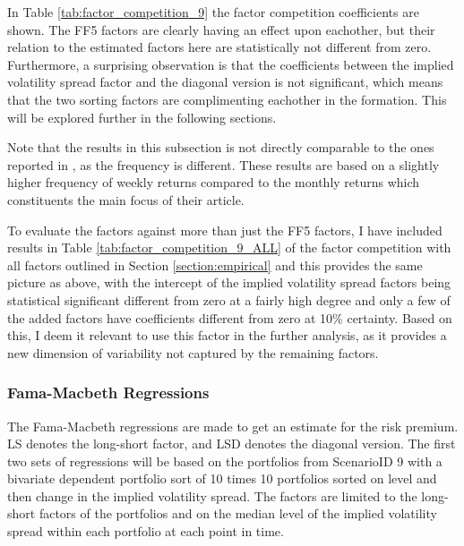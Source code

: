 In Table \ref{tab:factor_competition_9} the factor competition coefficients are shown. The FF5 factors are clearly having an effect upon eachother, but their relation to the estimated factors here are statistically not different from zero. Furthermore, a surprising observation is that the coefficients between the implied volatility spread factor and the diagonal version is not significant, which means that the two sorting factors are complimenting eachother in the formation. This will be explored further in the following sections. 

Note that the results in this subsection is not directly comparable to the ones reported in \cite{fama2015five}, as the frequency is different. These results are based on a slightly higher frequency of weekly returns compared to the monthly returns which constituents the main focus of their article.

To evaluate the factors against more than just the FF5 factors, I have included results in Table \ref{tab:factor_competition_9_ALL} of the factor competition with all factors outlined in Section \ref{section:empirical} and this provides the same picture as above, with the intercept of the implied volatility spread factors being statistical significant different from zero at a fairly high degree and only a few of the added factors have coefficients different from zero at 10\% certainty. Based on this, I deem it relevant to use this factor in the further analysis, as it provides a new dimension of variability not captured by the remaining factors.

\subsubsection{Fama-Macbeth Regressions}

The Fama-Macbeth regressions are made to get an estimate for the risk premium. LS denotes the long-short factor, and LSD denotes the diagonal version. The first two sets of regressions will be based on the portfolios from ScenarioID 9 with a bivariate dependent portfolio sort of 10 times 10 portfolios sorted on level and then change in the implied volatility spread. The factors are limited to the long-short factors of the portfolios and on the median level of the implied volatility spread within each portfolio at each point in time. 

